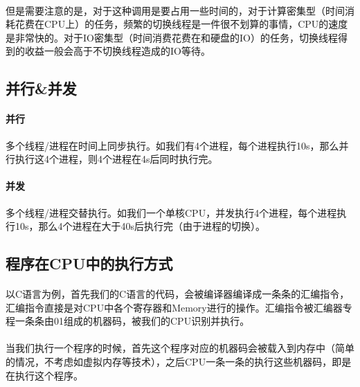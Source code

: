 \documentclass[12pt]{article}
\begin{document}
\begin{CJK}{UTF8}{gbsn}
\paragraph{}但是需要注意的是，对于这种调用是要占用一些时间的，对于计算密集型（时间消耗花费在CPU上）的任务，频繁的切换线程是一件很不划算的事情，CPU的速度是非常快的。对于IO密集型（时间消费花费在和硬盘的IO）的任务，切换线程得到的收益一般会高于不切换线程造成的IO等待。
\subsection{并行\&并发}
\paragraph{并行}多个线程/进程在时间上同步执行。如我们有4个进程，每个进程执行10s，那么并行执行这4个进程，则4个进程在4s后同时执行完。
\paragraph{并发}多个线程/进程交替执行。如我们一个单核CPU，并发执行4个进程，每个进程执行10s，那么4个进程在大于40s后执行完（由于进程的切换）。
\subsection{程序在CPU中的执行方式}
\paragraph{}以C语言为例，首先我们的C语言的代码，会被编译器编译成一条条的汇编指令，汇编指令直接是对CPU中各个寄存器和Memory进行的操作。汇编指令被汇编器专程一条条由01组成的机器码，被我们的CPU识别并执行。
\paragraph{}当我们执行一个程序的时候，首先这个程序对应的机器码会被载入到内存中（简单的情况，不考虑如虚拟内存等技术），之后CPU一条一条的执行这些机器码，即是在执行这个程序。

\end{CJK}
\end{document}
